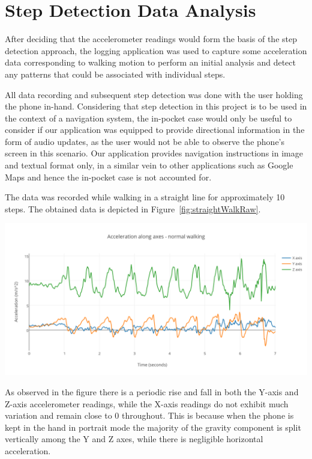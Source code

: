 \documentclass[main.tex]{subfiles}
\begin{document}
\section{Step Detection Data Analysis}

After deciding that the accelerometer readings would form the basis of the step detection approach, the logging application was used to capture some acceleration data corresponding to walking motion to perform an initial analysis and detect any patterns that could be associated with individual steps. 

All data recording and subsequent step detection was done with the user holding the phone in-hand. Considering that step detection in this project is to be used in the context of a navigation system, the in-pocket case would only be useful to consider if our application was equipped to provide directional information in the form of audio updates, as the user would not be able to observe the phone's screen in this scenario. Our application provides navigation instructions in image and textual format only, in a similar vein to other applications such as Google Maps and hence the in-pocket case is not accounted for.  

The data was recorded while walking in a straight line for approximately 10 steps. 
The obtained data is depicted in Figure~\ref{fig:straightWalkRaw}. 

\begin{center}
\includegraphics[scale=0.9]{images/straightWalkRaw.png}
\label{fig:straightWalkRaw}
\end{center}

As observed in the figure there is a periodic rise and fall in both the Y-axis and Z-axis accelerometer readings, while the X-axis readings do not exhibit much variation and remain close to 0 throughout. This is because when the phone is kept in the hand in portrait mode the majority of the gravity component is split vertically among the Y and Z axes, while there is negligible horizontal acceleration.
\end{document}
